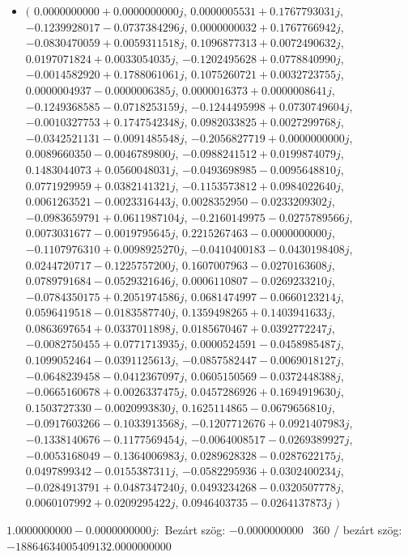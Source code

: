 \documentclass[14pt,a4paper]{article}
\begin{document}
\begin{itemize}
\item
$\big($
$0.0000000000+0.0000000000j$, $0.0000005531+0.1767793031j$, $-0.1239928017-0.0737384296j$, $0.0000000032+0.1767766942j$, $-0.0830470059+0.0059311518j$, $0.1096877313+0.0072490632j$, $0.0197071824+0.0033054035j$, $-0.1202495628+0.0778840990j$, $-0.0014582920+0.1788061061j$, $0.1075260721+0.0032723755j$, $0.0000004937-0.0000006385j$, $0.0000016373+0.0000008641j$, $-0.1249368585-0.0718253159j$, $-0.1244495998+0.0730749604j$, $-0.0010327753+0.1747542348j$, $0.0982033825+0.0027299768j$, $-0.0342521131-0.0091485548j$, $-0.2056827719+0.0000000000j$, $0.0089660350-0.0046789800j$, $-0.0988241512+0.0199874079j$, $0.1483044073+0.0560048031j$, $-0.0493698985-0.0095648810j$, $0.0771929959+0.0382141321j$, $-0.1153573812+0.0984022640j$, $0.0061263521-0.0023316443j$, $0.0028352950-0.0233209302j$, $-0.0983659791+0.0611987104j$, $-0.2160149975-0.0275789566j$, $0.0073031677-0.0019795645j$, $0.2215267463-0.0000000000j$, $-0.1107976310+0.0098925270j$, $-0.0410400183-0.0430198408j$, $0.0244720717-0.1225757200j$, $0.1607007963-0.0270163608j$, $0.0789791684-0.0529321646j$, $0.0006110807-0.0269233210j$, $-0.0784350175+0.2051974586j$, $0.0681474997-0.0660123214j$, $0.0596419518-0.0183587740j$, $0.1359498265+0.1403941633j$, $0.0863697654+0.0337011898j$, $0.0185670467+0.0392772247j$, $-0.0082750455+0.0771713935j$, $0.0000524591-0.0458985487j$, $0.1099052464-0.0391125613j$, $-0.0857582447-0.0069018127j$, $-0.0648239458-0.0412367097j$, $0.0605150569-0.0372448388j$, $-0.0665160678+0.0026337475j$, $0.0457286926+0.1694919630j$, $0.1503727330-0.0020993830j$, $0.1625114865-0.0679656810j$, $-0.0917603266-0.1033913568j$, $-0.1207712676+0.0921407983j$, $-0.1338140676-0.1177569454j$, $-0.0064008517-0.0269389927j$, $-0.0053168049-0.1364006983j$, $0.0289628328-0.0287622175j$, $0.0497899342-0.0155387311j$, $-0.0582295936+0.0302400234j$, $-0.0284913791+0.0487347240j$, $0.0493234268-0.0320507778j$, $0.0060107992+0.0209295422j$, $0.0946403735-0.0264137873j$
$\big)$
\end{itemize}
$1.0000000000-0.0000000000j$:\
Bezárt szög: $-0.0000000000$ \
360 / bezárt szög: $-18864634005409132.0000000000$\
\end{document}
